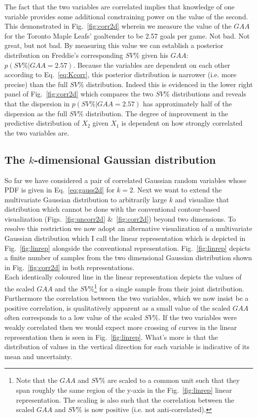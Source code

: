 The fact that the two variables are
correlated implies that knowledge of one variable provides some additional constraining
power on the value of the second. This demonstrated in Fig.~\ref{fig:corr2d}
wherein we measure the value of the $GAA$ for the Toronto Maple Leafs' goaltender
to be 2.57 goals per game. Not bad. Not great, but not bad. By measuring
this value we can establish a posterior distribution on Freddie's corresponding
$SV$\% given his $GAA$: $p(SV\%|GAA=2.57)$. Because the variables are dependent
on each other according to Eq.~\ref{eq:Kcorr}, this posterior distribution is
narrower (i.e. more precise) than the full $SV$\% distribution. Indeed this is
evidenced in the lower right panel of Fig.~\ref{fig:corr2d} which compares the
two $SV$\% distributions and reveals that the dispersion in $p(SV\%|GAA=2.57)$
has approximately half of the dispersion as the full $SV$\% distribution. The degree
of improvement in the predictive distribution of $X_2$ given $X_1$ is dependent
on how strongly correlated the two variables are. \\

\subsection{The $k$-dimensional Gaussian distribution}
So far we have considered a pair of correlated Gaussian random variables whose
PDF is given in Eq.~\ref{eq:gauss2d} for $k=2$. Next we want to extend the multivariate
Gaussian distribution to arbitrarily large $k$ and visualize that distribution which
cannot be done with the conventional contour-based visualization
(Figs.~\ref{fig:uncorr2d} \&~\ref{fig:corr2d}) beyond two dimensions. To resolve this
restriction we now adopt an alternative visualization of a multivariate Gaussian
distribution which I call the linear representation which is depicted in
Fig.~\ref{fig:linrep} alongside the conventional representation. Fig.~\ref{fig:linrep}
depicts a finite number of samples from the two dimensional Gaussian distribution shown
in Fig.~\ref{fig:corr2d} in both representations. \\

Each identically coloured line in the
linear representation depicts the values of the scaled $GAA$ and the $SV$\%\footnote{Note
  that the $GAA$ and $SV$\% are scaled to a common unit such that they span roughly
  the same region of the y-axis in the Fig.~\ref{fig:linrep} linear representation.
  The scaling is also such that the correlation between the scaled $GAA$ and $SV$\% is
  now positive (i.e. not anti-correlated).} for a single
sample from their joint distribution. Furthermore the correlation between the two variables,
which we now insist be a positive correlation, is qualitatively apparent as a small value
of the scaled $GAA$ often corresponds to a low value of the scaled $SV$\%. If the two
variables were weakly correlated then we would expect more crossing of curves in the
linear representation then is seen in Fig.~\ref{fig:linrep}. What's more is that the
distribution of values in the vertical direction for each variable is indicative of its
mean and uncertainty. \\

